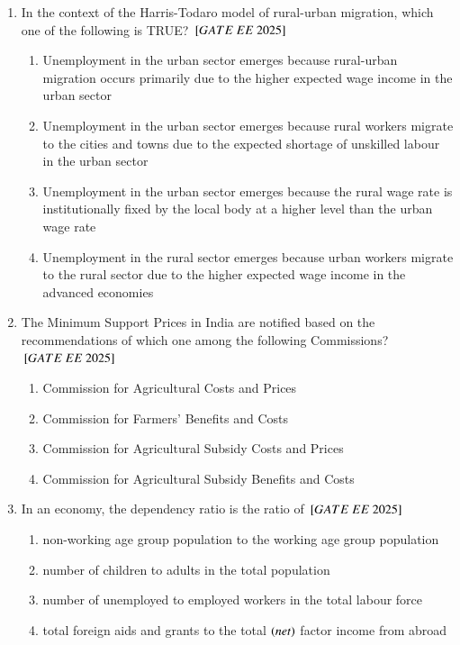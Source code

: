 \documentclass[journal,12pt,onecolumn]{IEEEtran}
\theoremstyle{remark}
\begin{document}
\begin{enumerate}
\item In the context of the Harris-Todaro model of rural-urban migration, which one of the following is TRUE?
${}\left[GATE\ EE\ 2025\right]$\\
    \begin{enumerate}[label=(\Alph*)]
    \item Unemployment in the urban sector emerges because rural-urban migration occurs primarily due to the higher expected wage income in the urban sector
    \item Unemployment in the urban sector emerges because rural workers migrate to the cities and towns due to the expected shortage of unskilled labour in the urban sector
    \item Unemployment in the urban sector emerges because the rural wage rate is institutionally fixed by the local body at a higher level than the urban wage rate
    \item Unemployment in the rural sector emerges because urban workers migrate to the rural sector due to the higher expected wage income in the advanced economies
    \end{enumerate}
 
\item The Minimum Support Prices in India are notified based on the recommendations of which one among the following Commissions?
${}\left[GATE\ EE\ 2025\right]$\\
    \begin{enumerate}[label=(\Alph*)]
    \item Commission for Agricultural Costs and Prices
    \item Commission for Farmers' Benefits and Costs
    \item Commission for Agricultural Subsidy Costs and Prices
    \item Commission for Agricultural Subsidy Benefits and Costs
    \end{enumerate}
 
\item In an economy, the dependency ratio is the ratio of
${}\left[GATE\ EE\ 2025\right]$\\
    \begin{enumerate}[label=(\Alph*)]
    \item non-working age group population to the working age group population
    \item number of children to adults in the total population
    \item number of unemployed to employed workers in the total labour force
    \item total foreign aids and grants to the total  $\left(net\right)$ factor income from abroad
    \end{enumerate}
 

\end{enumerate}
\end{document}
